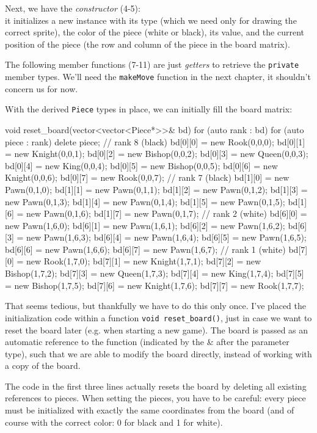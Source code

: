 Next, we have the \emph{constructor} (4-5):\\
it initializes a new instance with its type (which we need only for drawing the correct sprite),
the color of the piece (white or black), its value, and the current position
of the piece (the row and column of the piece in the board matrix).

The following member functions (7-11) are just \emph{getters} to retrieve the
\texttt{private} member types.
We'll need the \texttt{makeMove} function in the next chapter, it shouldn't concern us for now.

With the derived \texttt{Piece} types in place, we can initially fill the board matrix:

\begin{cpp}
void reset_board(vector<vector<Piece*>>& bd) {
  for (auto rank : bd) {
    for (auto piece : rank) {
      delete piece;
    }
  }
  // rank 8 (black)
  bd[0][0] = new Rook(0,0,0);
  bd[0][1] = new Knight(0,0,1);
  bd[0][2] = new Bishop(0,0,2);
  bd[0][3] = new Queen(0,0,3);
  bd[0][4] = new King(0,0,4);
  bd[0][5] = new Bishop(0,0,5);
  bd[0][6] = new Knight(0,0,6);
  bd[0][7] = new Rook(0,0,7);
  // rank 7 (black)
  bd[1][0] = new Pawn(0,1,0);
  bd[1][1] = new Pawn(0,1,1);
  bd[1][2] = new Pawn(0,1,2);
  bd[1][3] = new Pawn(0,1,3);
  bd[1][4] = new Pawn(0,1,4);
  bd[1][5] = new Pawn(0,1,5);
  bd[1][6] = new Pawn(0,1,6);
  bd[1][7] = new Pawn(0,1,7);
  // rank 2 (white)
  bd[6][0] = new Pawn(1,6,0);
  bd[6][1] = new Pawn(1,6,1);
  bd[6][2] = new Pawn(1,6,2);
  bd[6][3] = new Pawn(1,6,3);
  bd[6][4] = new Pawn(1,6,4);
  bd[6][5] = new Pawn(1,6,5);
  bd[6][6] = new Pawn(1,6,6);
  bd[6][7] = new Pawn(1,6,7);
  // rank 1 (white)
  bd[7][0] = new Rook(1,7,0);
  bd[7][1] = new Knight(1,7,1);
  bd[7][2] = new Bishop(1,7,2);
  bd[7][3] = new Queen(1,7,3);
  bd[7][4] = new King(1,7,4);
  bd[7][5] = new Bishop(1,7,5);
  bd[7][6] = new Knight(1,7,6);
  bd[7][7] = new Rook(1,7,7);
}
\end{cpp}

That seems tedious, but thankfully we have to do this only once.
I've placed the initialization code within a function \texttt{void reset_board()},
just in case we want to reset the board later (e.g. when starting a new game).
The board is passed as an automatic reference to the function (indicated by the \& after the
parameter type), such that we are able to modify the board directly,
instead of working with a copy of the board.

The code in the first three lines actually resets the board by deleting all existing
references to pieces.
When setting the pieces, you have to be careful: every piece must be initialized with exactly the
same coordinates from the board (and of course with the correct color: 0 for black and 1 for white).

